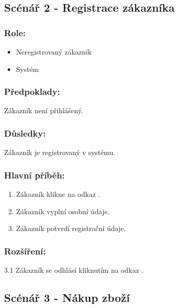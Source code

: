 \documentclass[11pt,twoside,a4paper]{book}
\begin{document}
\subsection{Scénář 2 - Registrace zákazníka}

\subsubsection*{Role:}

\begin{itemize}
\item Neregistrovaný zákazník
\item Systém
\end{itemize}

\subsubsection*{Předpoklady:}

Zákazník není přihlášený.

\subsubsection*{Důsledky:}

Zákazník je registrovaný v systému.

\subsubsection*{Hlavní příběh:}

\begin{enumerate}
\item Zákazník klikne na odkaz .
\item Zákazník vyplní osobní údaje.
\item Zákazník potvrdí registrační údaje.
\end{enumerate}

\subsubsection*{Rozšíření:}

\begin{description}
\item 3.1 Zákazník se odhlásí kliknutím na odkaz .
\end{description}

\subsection{Scénář 3 - Nákup zboží}
\end{document}
